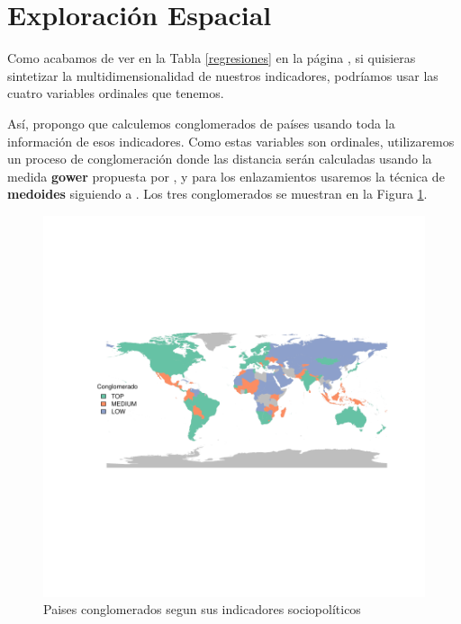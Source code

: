 \documentclass{article}
\begin{document}
\section{Exploración Espacial}

Como acabamos de ver en la Tabla \ref{regresiones} en la página \pageref{regresiones}, si quisieras sintetizar la multidimensionalidad de nuestros indicadores, podríamos usar las cuatro variables ordinales que tenemos. 

Así, propongo que calculemos conglomerados de países usando toda la información de esos indicadores. Como estas variables son ordinales, utilizaremos un proceso de conglomeración donde las distancia serán calculadas usando la medida {\bf gower} 
propuesta por \cite{gower_general_1971}
, y para los enlazamientos usaremos la técnica de {\bf medoides} 
siguiendo a \cite{reynolds_clustering_2006}
. Los tres conglomerados se muestran en la Figura \ref{clustmap}.






\begin{figure}[h]
\centering
\begin{adjustbox}{width=11cm,height=8cm,clip,trim=1cm 2.5cm 0cm 2.5cm}
\includegraphics{paperVersion_6-plotMap1}
\end{adjustbox}
\caption{Paises conglomerados segun sus indicadores sociopolíticos}\label{clustmap}
\end{figure}

 
\renewcommand{\refname}{Bibliografia}

\end{document}
